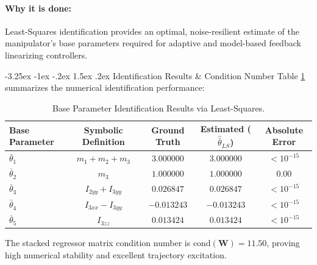 \documentclass[11pt, a4paper]{article}
\makeatletter
\renewcommand{\subsection}{\@startsection{subsection}{2}{\z@}%
    {-3.25ex \@plus -1ex \@minus -.2ex}%
    {1.5ex \@plus .2ex}%
    {\normalfont\large\bfseries\color{brandaccent}}}
\makeatother
\begin{document}
\paragraph{Why it is done:}
Least-Squares identification provides an optimal, noise-resilient estimate of the manipulator's base parameters required for adaptive and model-based feedback linearizing controllers.

\subsection{Identification Results \& Condition Number}
Table \ref{tab:identification_results} summarizes the numerical identification performance:

\begin{table}[h!]
\centering
\caption{Base Parameter Identification Results via Least-Squares.}
\label{tab:identification_results}
\setlength{\tabcolsep}{4pt}
\begin{tabular}{lcccc}
\toprule
\textbf{Base Parameter} & \textbf{Symbolic Definition} & \textbf{Ground Truth} & \textbf{Estimated ($\hat{\bar{\theta}}_{LS}$)} & \textbf{Absolute Error} \\
\midrule
$\bar{\theta}_1$ & $m_1 + m_2 + m_3$ & $3.000000$ & $3.000000$ & $< 10^{-15}$ \\
$\bar{\theta}_2$ & $m_3$ & $1.000000$ & $1.000000$ & $0.00$ \\
$\bar{\theta}_3$ & $I_{2yy} + I_{3yy}$ & $0.026847$ & $0.026847$ & $< 10^{-15}$ \\
$\bar{\theta}_4$ & $I_{3xx} - I_{3yy}$ & $-0.013243$ & $-0.013243$ & $< 10^{-15}$ \\
$\bar{\theta}_5$ & $I_{3zz}$ & $0.013424$ & $0.013424$ & $< 10^{-15}$ \\
\bottomrule
\end{tabular}
\end{table}

The stacked regressor matrix condition number is $\text{cond}(\mathbf{W}) = 11.50$, proving high numerical stability and excellent trajectory excitation.
\end{document}
